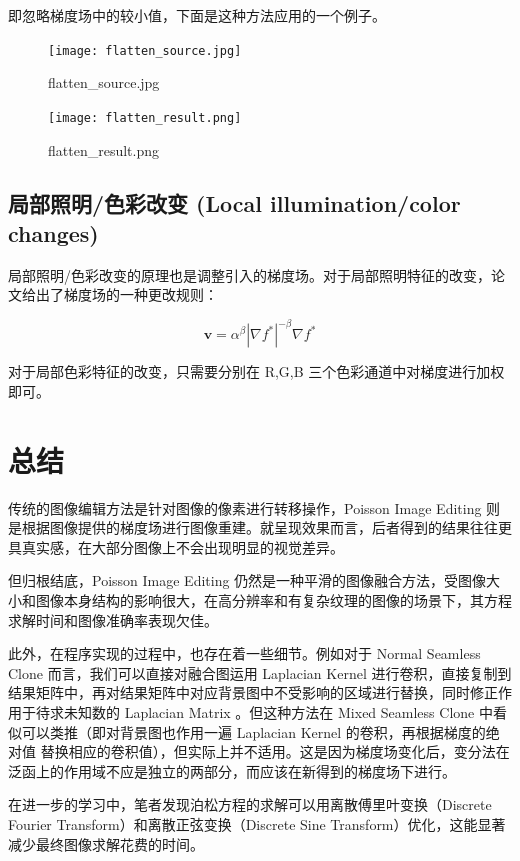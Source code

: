 \documentclass[lang=cn,11pt,a4paper]{elegantpaper}
\begin{document}
即忽略梯度场中的较小值，下面是这种方法应用的一个例子。

\begin{figure}[ht]
    \centering
	\begin{minipage}{0.35\linewidth}
		\centering
		\texttt{[image: flatten\_source.jpg]}
		\caption{flatten\_source.jpg}
	\end{minipage}%
	\begin{minipage}{0.35\linewidth}
		\centering
		\texttt{[image: flatten\_result.png]}
		\caption{flatten\_result.png}
	\end{minipage}
\end{figure}

\subsection{局部照明/色彩改变 (Local illumination/color changes)}

局部照明/色彩改变的原理也是调整引入的梯度场。对于局部照明特征的改变，论文给出了梯度场的一种更改规则：

\begin{equation}
\mathbf{v}=\alpha^{\beta}\left|\nabla f^{*}\right|^{-\beta} \nabla f^{*}
\end{equation}

对于局部色彩特征的改变，只需要分别在 R,G,B 三个色彩通道中对梯度进行加权即可。

\section{总结}

传统的图像编辑方法是针对图像的像素进行转移操作，Poisson Image Editing 则是根据图像提供的梯度场进行图像重建。就呈现效果而言，后者得到的结果往往更具真实感，在大部分图像上不会出现明显的视觉差异。

但归根结底，Poisson Image Editing 仍然是一种平滑的图像融合方法，受图像大小和图像本身结构的影响很大，在高分辨率和有复杂纹理的图像的场景下，其方程求解时间和图像准确率表现欠佳。

此外，在程序实现的过程中，也存在着一些细节。例如对于 Normal Seamless Clone 而言，我们可以直接对融合图运用 Laplacian Kernel 进行卷积，直接复制到结果矩阵中，再对结果矩阵中对应背景图中不受影响的区域进行替换，同时修正作用于待求未知数的 Laplacian Matrix 。但这种方法在 Mixed Seamless Clone 中看似可以类推（即对背景图也作用一遍 Laplacian Kernel 的卷积，再根据梯度的绝对值 替换相应的卷积值），但实际上并不适用。这是因为梯度场变化后，变分法在泛函上的作用域不应是独立的两部分，而应该在新得到的梯度场下进行。

在进一步的学习中，笔者发现泊松方程的求解可以用离散傅里叶变换（Discrete Fourier Transform）和离散正弦变换（Discrete Sine Transform）优化，这能显著减少最终图像求解花费的时间。
\end{document}
